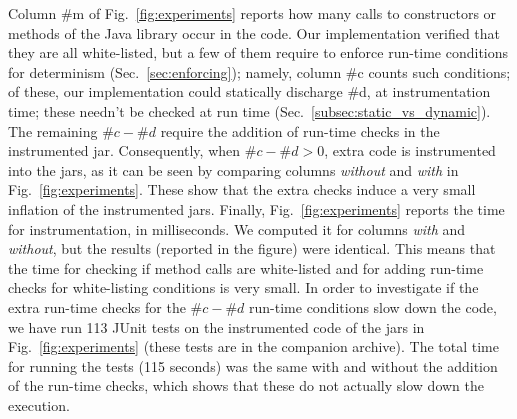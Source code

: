 Column \#m of Fig.~\ref{fig:experiments} reports how many calls to constructors
or methods of the Java library occur in the code. Our implementation
verified that they are all white-listed,
but a few of them require to enforce run-time conditions for determinism
(Sec.~\ref{sec:enforcing}); namely, column \#c counts such conditions;
of these, our implementation could statically discharge \#d, at instrumentation time; these needn't
be checked at run time (Sec.~\ref{subsec:static_vs_dynamic}). The remaining
$\#c - \#d$ require the addition of run-time checks in the instrumented jar. Consequently,
when $\#c - \#d > 0$, extra code is instrumented into the jars, as it can be seen by comparing
columns \emph{without} and \emph{with} in Fig.~\ref{fig:experiments}. These
show that the extra checks induce a very small inflation of the instrumented jars.
Finally, Fig.~\ref{fig:experiments} reports the time for instrumentation, in milliseconds.
We computed it for columns \emph{with} and \emph{without}, but the results
(reported in the figure) were identical. This means that the time for
checking if method calls are white-listed and for adding run-time checks for white-listing
conditions is very small.
In order to investigate if the extra run-time checks for the $\#c - \#d$ run-time conditions
slow down the code, we have run 113 JUnit tests on the instrumented code of the jars in Fig.~\ref{fig:experiments}
(these tests are in the companion archive). The total time for running the
tests (115 seconds) was the same with and without the addition of the run-time checks, which shows that
these do not actually slow down the execution.
